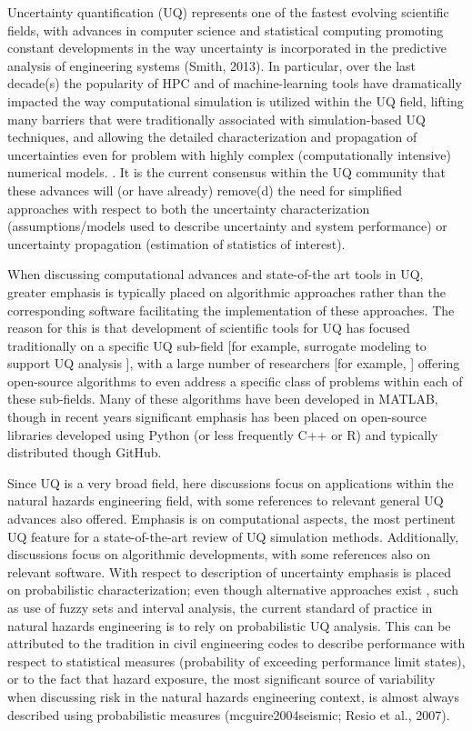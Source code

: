 Uncertainty quantification (UQ) represents one of the fastest evolving scientific fields, with advances in computer science and statistical computing promoting constant developments in the way uncertainty is incorporated in the predictive analysis of engineering systems (Smith, 2013). In particular, over the last decade(s) the popularity of HPC and of machine-learning tools have dramatically impacted the way computational simulation is utilized within the UQ field, lifting many barriers that were traditionally associated with simulation-based UQ techniques, and allowing the detailed characterization and propagation of uncertainties even for problem with highly complex (computationally intensive) numerical models. . It is the current consensus within the UQ community that these advances will (or have already) remove(d) the need for simplified approaches with respect to both the uncertainty characterization (assumptions/models used to describe uncertainty and system performance) or uncertainty propagation (estimation of statistics of interest). 

When discussing computational advances and state-of-the art tools in UQ, greater emphasis is typically placed on algorithmic approaches rather than the corresponding software facilitating the implementation of these approaches. The reason for this is that development of scientific tools for UQ has focused traditionally on a specific UQ sub-field [for example, surrogate modeling to support UQ analysis \citep{lophaven2002dacea,gorissen2010surrogate}], with a large number of researchers [for example, \citep{bect2017bayesian,clement2018methods}] offering open-source algorithms to even address a specific class of problems within each of these sub-fields. Many of these algorithms have been developed in MATLAB, though in recent years significant emphasis has been placed on open-source libraries developed using Python (or less frequently C++ or R) and typically distributed though GitHub.    

Since UQ is a very broad field, here discussions focus on applications within the natural hazards engineering field, with some references to relevant general UQ advances also offered. Emphasis is on computational aspects, the most pertinent UQ feature for a state-of-the-art review of UQ simulation methods. Additionally, discussions focus on algorithmic developments, with some references also on relevant software. With respect to description of uncertainty emphasis is placed on probabilistic characterization; even though alternative approaches exist \citep{beer2013imprecise}, such as use of fuzzy sets and interval analysis, the current standard of practice in natural hazards engineering is to rely on probabilistic UQ analysis. This can be attributed to the tradition in civil engineering codes to describe performance with respect to statistical measures (probability of exceeding performance limit states), or to the fact that hazard exposure, the most significant source of variability when discussing risk in the natural hazards engineering context, is almost always described using probabilistic measures (mcguire2004seismic; Resio et al., 2007). 

